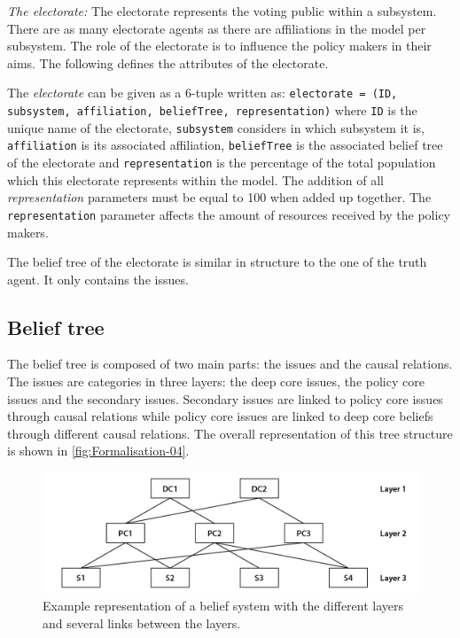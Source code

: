 \emph{The electorate: } The electorate represents the voting public within a subsystem. There are as many electorate agents as there are affiliations in the model per subsystem. The role of the electorate is to influence the policy makers in their aims. The following defines the attributes of the electorate.

The \emph{electorate} can be given as a 6-tuple written as: \texttt{electorate = (ID, subsystem, affiliation, beliefTree, representation)} where \texttt{ID} is the unique name of the electorate, \texttt{subsystem} considers in which subsystem it is, \texttt{affiliation} is its associated affiliation, \texttt{beliefTree} is the associated belief tree of the electorate and \texttt{representation} is the percentage of the total population which this electorate represents within the model. The addition of all \emph{representation} parameters must be equal to 100 when added up together. The \texttt{representation} parameter affects the amount of resources received by the policy makers.

The belief tree of the electorate is similar in structure to the one of the truth agent. It only contains the issues.



\subsection{Belief tree}

The belief tree is composed of two main parts: the issues and the causal relations. The issues are categories in three layers: the deep core issues, the policy core issues and the secondary issues. Secondary issues are linked to policy core issues through causal relations while policy core issues are linked to deep core beliefs through different causal relations. The overall representation of this tree structure is shown in \autoref{fig:Formalisation-04}.

\begin{figure}
\centering
\includegraphics[scale = 0.75, angle = 0]{figures/Formalisation-04}
\caption{Example representation of a belief system with the different layers and several links between the layers.}
\label{fig:Formalisation-04}
\end{figure}

